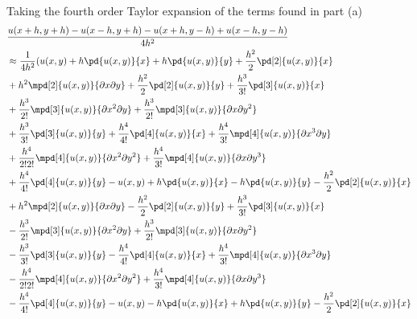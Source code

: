 \documentclass[11pt]{article}
\begin{document}
\begin{enumerate}
\begin{enumerate}
                Taking the fourth order Taylor expansion of the terms found in part (a)
                \begin{align*}
                    &\frac{u(x+h, y+h) - u(x-h, y+h) - u(x+h, y-h) + u(x-h, y-h)}{4h^2} \\
                    &\approx \frac{1}{4h^2} (u(x,y) + h\pd{u(x,y)}{x} + h\pd{u(x,y)}{y}
                        + \frac{h^2}{2} \pd[2]{u(x,y)}{x} \\
                        &+ h^2\mpd[2]{u(x,y)}{\partial x \partial y}
                        + \frac{h^2}{2}\pd[2]{u(x,y)}{y}
                        + \frac{h^3}{3!}\pd[3]{u(x,y)}{x} \\
                        &+ \frac{h^3}{2!} \mpd[3]{u(x,y)}{\partial x^2 \partial y}
                        + \frac{h^3}{2!} \mpd[3]{u(x,y)}{\partial x \partial y^2} \\
                        &+ \frac{h^3}{3!} \pd[3]{u(x,y)}{y}
                        + \frac{h^4}{4!} \pd[4]{u(x,y)}{x}
                        + \frac{h^4}{3!} \mpd[4]{u(x,y)}{\partial x^3 \partial y} \\
                        &+ \frac{h^4}{2! 2!} \mpd[4]{u(x,y)}{\partial x^2 \partial y^2}
                        + \frac{h^4}{3!} \mpd[4]{u(x,y)}{\partial x \partial y^3} \\
                        &+ \frac{h^4}{4!} \pd[4]{u(x,y)}{y} - 
                        u(x,y) + h\pd{u(x,y)}{x} - h\pd{u(x,y)}{y}
                        - \frac{h^2}{2} \pd[2]{u(x,y)}{x} \\
                        &+ h^2\mpd[2]{u(x,y)}{\partial x \partial y}
                        - \frac{h^2}{2}\pd[2]{u(x,y)}{y}
                        + \frac{h^3}{3!}\pd[3]{u(x,y)}{x} \\
                        &- \frac{h^3}{2!} \mpd[3]{u(x,y)}{\partial x^2 \partial y}
                        + \frac{h^3}{2!} \mpd[3]{u(x,y)}{\partial x \partial y^2} \\
                        &- \frac{h^3}{3!} \pd[3]{u(x,y)}{y}
                        - \frac{h^4}{4!} \pd[4]{u(x,y)}{x}
                        + \frac{h^4}{3!} \mpd[4]{u(x,y)}{\partial x^3 \partial y} \\
                        &- \frac{h^4}{2! 2!} \mpd[4]{u(x,y)}{\partial x^2 \partial y^2}
                        + \frac{h^4}{3!} \mpd[4]{u(x,y)}{\partial x \partial y^3} \\
                        &- \frac{h^4}{4!} \pd[4]{u(x,y)}{y} - u(x,y) - h\pd{u(x,y)}{x} + h\pd{u(x,y)}{y}
                        - \frac{h^2}{2} \pd[2]{u(x,y)}{x} \\

\end{align*}
\end{enumerate}
\end{enumerate}
\end{document}
